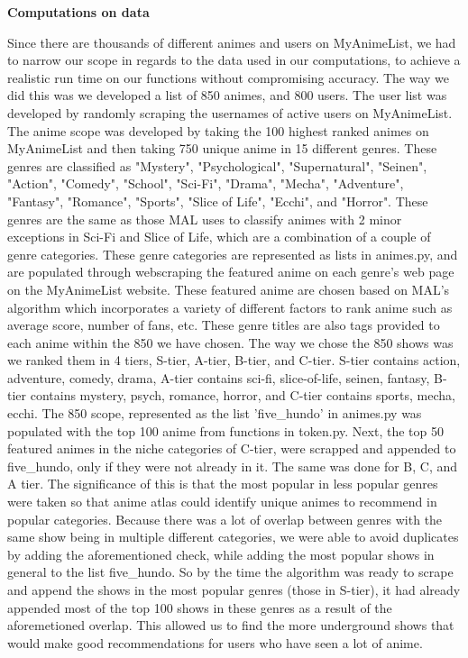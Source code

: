 \documentclass[fontsize=11pt]{article}
\begin{document}
\textbf{Computations on data}
\item[]Since there are thousands of different animes and users on MyAnimeList, we had to narrow our scope in regards to the data used in our computations, to achieve a realistic run time on our functions without compromising accuracy. The way we did this was we developed a list of 850 animes, and 800 users. The user list was developed by randomly scraping the usernames of active users on MyAnimeList. The anime scope was developed by taking the 100 highest ranked animes on MyAnimeList and then taking 750 unique anime in 15 different genres. These genres are classified as "Mystery", "Psychological", "Supernatural", "Seinen", "Action", "Comedy", "School", "Sci-Fi", "Drama", "Mecha", "Adventure", "Fantasy", "Romance", "Sports", "Slice of Life", "Ecchi", and "Horror". These genres are  the same as those MAL uses to classify animes with 2 minor exceptions in Sci-Fi and Slice of Life, which are a combination of a couple of genre categories. These genre categories are represented as lists in animes.py, and are populated through webscraping the featured anime on each genre's web page on the MyAnimeList website. These featured anime are chosen based on MAL's algorithm which incorporates a variety of different factors to rank anime such as average score, number of fans, etc. These genre titles are also tags provided to each anime within the 850 we have chosen. The way we chose the 850 shows was we ranked them in 4 tiers, S-tier, A-tier, B-tier, and C-tier. S-tier contains action, adventure, comedy, drama, A-tier contains sci-fi, slice-of-life, seinen, fantasy, B-tier contains mystery, psych, romance, horror, and C-tier contains sports, mecha, ecchi. The 850 scope, represented as the list 'five\_hundo' in animes.py was populated with the top 100 anime from functions in token.py. Next, the top 50 featured animes in the niche categories of C-tier, were scrapped and appended to five\_hundo, only if they were not already in it. The same was done for B, C, and A tier. The significance of this is that the most popular in less popular genres were taken so that anime atlas could identify unique animes to recommend in popular categories. Because there was a lot of overlap between genres with the same show being in multiple different categories, we were able to avoid duplicates by adding the aforementioned check, while adding the most popular shows in general to the list five\_hundo. So by the time the algorithm was ready to scrape and append the shows in the most popular genres (those in S-tier), it had already appended most of the top 100 shows in these genres as a result of the aforemetioned overlap. This allowed us to find the more underground shows that would make good recommendations for users who have seen a lot of anime. \\
\end{document}
